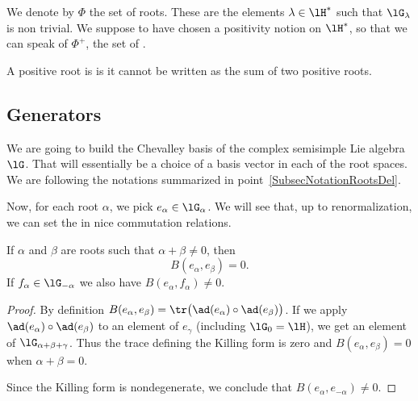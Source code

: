 We denote by \( \Phi\) the set of roots. These are the elements \( \lambda\in\lH^*\) such that \( \lG_{\lambda}\) is non trivial. We suppose to have chosen a positivity notion on \( \lH^*\), so that we can speak of \( \Phi^+\), the set of .

A positive root is  is it cannot be written as the sum of two positive roots.

                    \subsection{Generators}

We are going to build the Chevalley basis of the complex semisimple Lie algebra \( \lG\). That will essentially be a choice of a basis vector in each of the root spaces. We are following the notations summarized in point~\ref{SubsecNotationRootsDel}.


Now, for each root $\alpha$, we pick $e_{\alpha}\in\lG_{\alpha}$. We will see that, up to renormalization, we can set the in nice commutation relations.

\begin{lemma}       \label{LemBalpahbetaef}
    If \( \alpha\) and \( \beta\) are roots such that \( \alpha+\beta\neq 0\), then
    \begin{equation}
        B(e_{\alpha},e_{\beta})=0.
    \end{equation}
    If \( f_{\alpha}\in\lG_{-\alpha}\) we also have \( B(e_{\alpha},f_{\alpha})\neq 0\).
\end{lemma}

\begin{proof}
    By definition \( B(e_{\alpha},e_{\beta})=\tr\big( \ad(e_{\alpha})\circ\ad(e_{\beta}) \big)\). If we apply \( \ad(e_{\alpha})\circ\ad(e_{\beta})\) to an element of \( e_{\gamma}\) (including \( \lG_0=\lH\)), we get an element of \( \lG_{\alpha+\beta+\gamma}\). Thus the trace defining the Killing form is zero and \( B(e_{\alpha},e_{\beta})=0\) when \( \alpha+\beta=0\).

    Since the Killing form is nondegenerate, we conclude that \( B(e_{\alpha},e_{-\alpha})\neq 0 \).
\end{proof}

